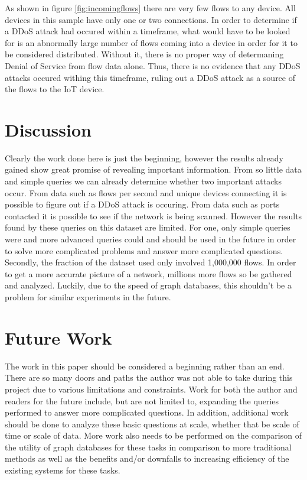 \documentclass[conference]{IEEEtran}
\begin{document}
As shown in figure \ref{fig:incomingflows} there are very few flows to any device. All devices in this sample have 
only one or two connections. In order to determine if a DDoS attack had occured within a timeframe, what would have
to be looked for is an abnormally large number of flows coming into a device in order for it to be considered
distributed. Without it, there is no proper way of determaning Denial of Service from flow data alone. 
Thus, there is no evidence that any DDoS attacks occured withing this timeframe, ruling out a DDoS attack as a source 
of the flows to the IoT device. 

\section{Discussion}

Clearly the work done here is just the beginning, however the results already gained show great promise of revealing
important information. From so little data and simple queries we can already determine whether two important attacks
occur. From data such as flows per second and unique devices connecting it is possible to figure out if a DDoS attack
is occuring. From data such as ports contacted it is possible to see if the network is being scanned.
However the results found by these queries on this dataset are limited. For one, only simple queries were
and more advanced queries could and should be used in the future in order to solve more complicated problems and
answer more complicated questions. Secondly, the fraction of the dataset used only involved 1,000,000 flows. In
order to get a more accurate picture of a network, millions more flows so be gathered and analyzed. Luckily,
due to the speed of graph databases, this shouldn't be a problem for similar experiments in the future. 

\section{Future Work}

The work in this paper should be considered a beginning rather than an end. There are so many doors and paths
the author was not able to take during this project due to various limitations and constraints. Work for both
the author and readers for the future include, but are not limited to, expanding the queries performed to answer
more complicated questions. In addition, additional work should be done to analyze these basic questions at scale,
whether that be scale of time or scale of data. More work also needs to be performed on the comparison of the
utility of graph databases for these tasks in comparison to more traditional methods as well as the benefits
and/or downfalls to increasing efficiency of the existing systems for these tasks.
\end{document}
